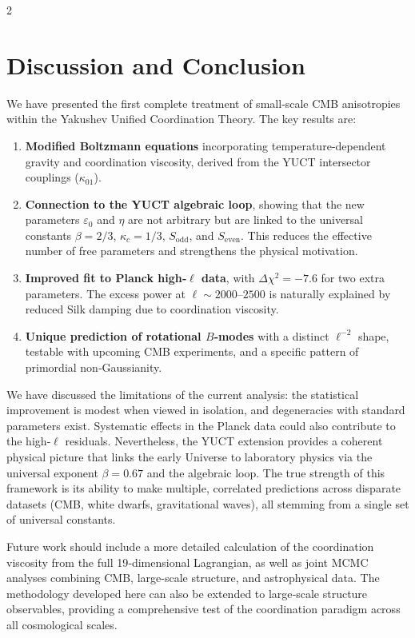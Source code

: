 \documentclass[11pt,a4paper]{article}
\begin{document}
\begin{multicols}{2}
		\section{Discussion and Conclusion}
		
		We have presented the first complete treatment of small‑scale CMB anisotropies within the Yakushev Unified Coordination Theory. The key results are:
		\begin{enumerate}
			\item \textbf{Modified Boltzmann equations} incorporating temperature‑dependent gravity and coordination viscosity, derived from the YUCT intersector couplings ($\kappa_{01}$).
			\item \textbf{Connection to the YUCT algebraic loop}, showing that the new parameters $\varepsilon_0$ and $\eta$ are not arbitrary but are linked to the universal constants $\beta=2/3$, $\kappa_c=1/3$, $S_{\mathrm{odd}}$, and $S_{\mathrm{even}}$. This reduces the effective number of free parameters and strengthens the physical motivation.
			\item \textbf{Improved fit to Planck high‑$\ell$ data}, with $\Delta\chi^2 = -7.6$ for two extra parameters. The excess power at $\ell \sim 2000$--$2500$ is naturally explained by reduced Silk damping due to coordination viscosity.
			\item \textbf{Unique prediction of rotational $B$‑modes} with a distinct $\ell^{-2}$ shape, testable with upcoming CMB experiments, and a specific pattern of primordial non‑Gaussianity.
		\end{enumerate}
		
		We have discussed the limitations of the current analysis: the statistical improvement is modest when viewed in isolation, and degeneracies with standard parameters exist. Systematic effects in the Planck data could also contribute to the high‑$\ell$ residuals. Nevertheless, the YUCT extension provides a coherent physical picture that links the early Universe to laboratory physics via the universal exponent $\beta = 0.67$ and the algebraic loop. The true strength of this framework is its ability to make multiple, correlated predictions across disparate datasets (CMB, white dwarfs, gravitational waves), all stemming from a single set of universal constants.
		
		Future work should include a more detailed calculation of the coordination viscosity from the full 19‑dimensional Lagrangian, as well as joint MCMC analyses combining CMB, large-scale structure, and astrophysical data. The methodology developed here can also be extended to large‑scale structure observables, providing a comprehensive test of the coordination paradigm across all cosmological scales.
		

\end{multicols}
\end{document}
